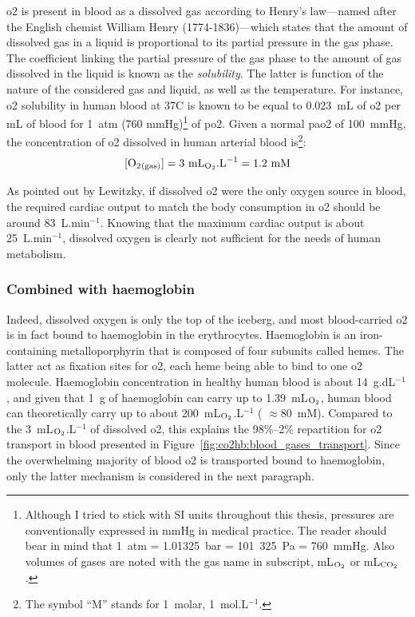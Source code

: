 \gls{o2} is present in blood as a dissolved gas according to Henry's law---named after the English chemist William Henry (1774-1836)---which states that the amount of dissolved gas in a liquid is proportional to its partial pressure in the gas phase\cite{henry1803}. The coefficient linking the partial pressure of the gas phase to the amount of gas dissolved in the liquid is known as the \emph{solubility}. The latter is function of the nature of the considered gas and liquid, as well as the temperature. For instance, \gls{o2} solubility in human blood at 37{\degree}C is known to be equal to 0.023~mL of \gls{o2} per mL of blood for 1~atm (760 mmHg)\footnote{Although I tried to stick with SI units throughout this thesis, pressures are conventionally expressed in mmHg in medical practice. The reader should bear in mind that 1~atm = 1.01325~bar = 101~325~Pa = 760~mmHg. Also volumes of gases are noted with the gas name in subscript, \eg{} mL$_{\ce{O2}}$ or mL$_{\ce{CO2}}$.} of \gls{po2}\cite{resp_care}. Given a normal \gls{pao2} of 100~mmHg\cite{malatesha2007}, the concentration of \gls{o2} dissolved in human arterial blood is\footnote{The symbol \enquote{M} stands for 1~molar, \ie{} 1~mol.L$^{-1}$.}:
\begin{equation}
	\ce{[O2_{(gas)}]} = 3 \text{ mL}_{\ce{O2}}.\text{L}^{-1} = 1.2 \text{ mM}
\end{equation}

As pointed out by Lewitzky\cite[p.~143]{levitzky2003pulmonary}, if dissolved \gls{o2} were the only oxygen source in blood, the required cardiac output to match the body consumption in \gls{o2} should be around 83~L.min$^{-1}$. Knowing that the maximum cardiac output is about 25~L.min$^{-1}$, dissolved oxygen is clearly not sufficient for the needs of human metabolism.

\subsubsection{Combined with haemoglobin}

Indeed, dissolved oxygen is only the top of the iceberg, and most blood-carried \gls{o2} is in fact bound to haemoglobin in the erythrocytes. Haemoglobin is an iron-containing metalloporphyrin that is composed of four subunits called hemes. The latter act as fixation sites for \gls{o2}, each heme being able to bind to one \gls{o2} molecule\cite{antonini1970}. Haemoglobin concentration in healthy human blood is about 14~g.dL$^{-1}$, and given that 1~g of haemoglobin can carry up to 1.39~mL$_{\ce{O2}}$, human blood can theoretically carry up to about 200~mL$_{\ce{O2}}$.L$^{-1}$\cite[Chap.~11]{nunns} (\ie{} $\approx80$~mM). Compared to the 3~mL$_{\ce{O2}}$.L$^{-1}$ of dissolved \gls{o2}, this explains the 98\%--2\% repartition for \gls{o2} transport in blood presented in Figure~\ref{fig:co2hb:blood_gases_transport}. Since the overwhelming majority of blood \gls{o2} is transported bound to haemoglobin, only the latter mechanism is considered in the next paragraph.

